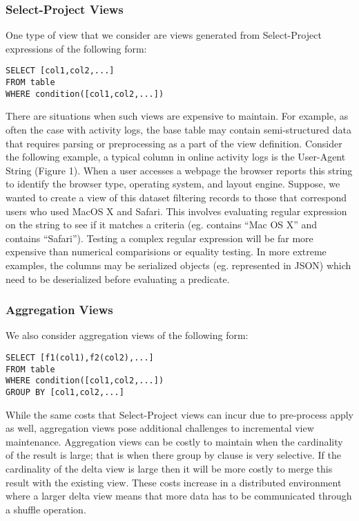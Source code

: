 \subsubsection{Select-Project Views}

One type of view that we consider are views generated from Select-Project
expressions of the following form:

\begin{lstlisting}
SELECT [col1,col2,...] 
FROM table 
WHERE condition([col1,col2,...]) 
\end{lstlisting}
There are situations when such views are expensive to maintain. For
example, as often the case with activity logs, the base table may
contain semi-structured data that requires parsing or preprocessing
as a part of the view definition. Consider the following example,
a typical column in online activity logs is the User-Agent String
(Figure 1). When a user accesses a webpage the browser reports this
string to identify the browser type, operating system, and layout
engine. Suppose, we wanted to create a view of this dataset filtering
records to those that correspond users who used MacOS X and Safari.
This involves evaluating regular expression on the string to see if
it matches a criteria (eg. contains ``Mac OS X'' and contains ``Safari'').
Testing a complex regular expression will be far more expensive than
numerical comparisions or equality testing. In more extreme examples,
the columns may be serialized objects (eg. represented in JSON) which
need to be deserialized before evaluating a predicate.





\subsubsection{Aggregation Views}

We also consider aggregation views of the following form:

\begin{lstlisting}
SELECT [f1(col1),f2(col2),...] 
FROM table 
WHERE condition([col1,col2,...]) 
GROUP BY [col1,col2,...]
\end{lstlisting}


While the same costs that Select-Project views can incur due to pre-process
apply as well, aggregation views pose additional challenges to incremental
view maintenance. Aggregation views can be costly to maintain when
the cardinality of the result is large; that is when there group by
clause is very selective. If the cardinality of the delta view is
large then it will be more costly to merge this result with the existing
view. These costs increase in a distributed environment where a larger
delta view means that more data has to be communicated through a shuffle
operation. 


